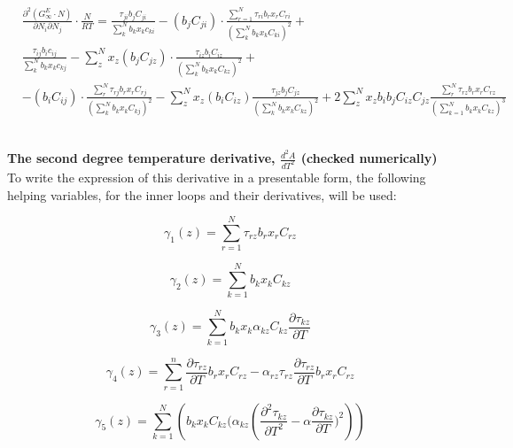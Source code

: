 \documentclass[a4paper, 12pt, english, sintefheadings, sintefcolour]{sintefmemo}
\begin{document}
\begin{equation}
\begin{split}
&\frac{\partial^2 \left(G_{\infty}^E\cdot N\right)}{\partial N_i \partial N_j}\cdot\frac{N}{RT}=\frac{\tau_{ji}b_jC_{ji}}{\sum_k^N b_kx_kc_{ki}}-(b_jC_{ji})\cdot\frac{\sum_{r=1}^N\tau_{ri}b_rx_rC_{ri}}{\left(\sum_k^N b_kx_kC_{ki}\right)^2} +\\
& \frac{\tau_{ij}b_ic_{ij}}{\sum_k^N b_kx_kc_{kj}}-\sum_z^N x_z(b_jC_{jz})\cdot\frac{\tau_{iz}b_iC_{iz}}{\left(\sum_k^N b_kx_kC_{kz}\right)^2}+\\
&-(b_iC_{ij})\cdot\frac{\sum_r^N \tau_{rj}b_rx_rC_{rj}}{\left(\sum_k^N b_kx_kC_{kj}\right)^2}-\sum_z^N x_z(b_iC_{iz})\frac{\tau_{jz}b_jC_{jz}}{\left(\sum_k^N b_kx_kC_{kz}\right)^2}+2\sum_z^N x_zb_ib_jC_{iz}C_{jz}\frac{\sum_r^N \tau_{rz}b_rx_rC_{rz}}{\left(\sum_{k=1}^N b_kx_kC_{kz}\right)^3}
\end{split}
\end{equation}

\noindent\hrulefill\\

\textbf{The second degree temperature derivative, $\frac{d^2A}{dT^2}$ (checked numerically)}\\
To write the expression of this derivative in a presentable form, the
following helping variables, for the inner loops and their derivatives, will
be used:

\begin{equation}
\gamma_1(z)=\sum_{r=1}^N\tau_{rz}b_rx_rC_{rz}
\end{equation}

\begin{equation}
\gamma_2(z)=\sum_{k=1}^N b_kx_kC_{kz}
\end{equation}

\begin{equation}
\gamma_3(z)=\sum_{k=1}^N b_kx_k\alpha_{kz}C_{kz}\frac{\partial \tau_{kz}}{\partial T}
\end{equation}

\begin{equation}
\gamma_4(z)=\sum_{r=1}^n \frac{\partial \tau_{rz}}{\partial T}b_rx_rC_{rz}-\alpha_{rz}\tau_{rz}\frac{\partial \tau_{rz}}{\partial T}b_rx_rC_{rz}
\end{equation}

\begin{equation}
\gamma_5(z)=\sum_{k=1}^N \left(b_kx_kC_{kz}(\alpha_{kz}\left(\frac{\partial^2\tau_{kz}}{\partial T^2}-\alpha\frac{\partial \tau_{kz}}{\partial T})^2\right)\right)
\end{equation}
\end{document}
